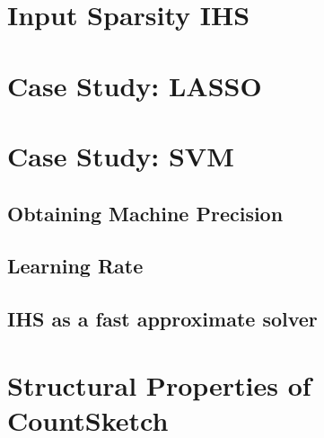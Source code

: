 \documentclass[twoside]{article}
\theoremstyle{definition}\newtheorem{thm}{Theorem}[section]
\theoremstyle{definition}\newtheorem{mydef}[thm]{Definition}
\theoremstyle{definition}\newtheorem{rem}[thm]{Remark}
\theoremstyle{definition}\newtheorem{prop}[thm]{Proposition}
\theoremstyle{definition}\newtheorem{example}[thm]{Example}
\theoremstyle{definition}\newtheorem{claim}[thm]{Claim}
\theoremstyle{definition}\newtheorem{Qu}[thm]{Question}
\theoremstyle{definition}\newtheorem{Lemma}[thm]{Lemma}
\theoremstyle{definition}\newtheorem{Cor}[thm]{Corollary}
\theoremstyle{definition}\newtheorem{Fact}[]{Fact}
\begin{document}
\section{Input Sparsity IHS} \label{sec: countsketch-ihs}








\section{Case Study: LASSO} \label{sec: ihs-lasso}


\section{Case Study: SVM}

\subsection{Obtaining Machine Precision}

\subsection{Learning Rate}

\subsection{IHS as a fast approximate solver}


\appendix

\section{Structural Properties of CountSketch} \label{sec: countsketch-proofs}




\end{document}
